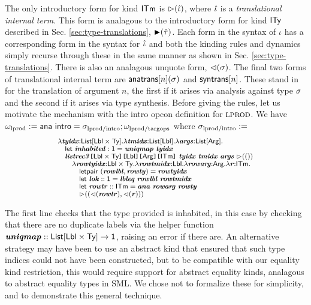 \documentclass[10pt,preprint]{sigplanconf}
\begin{document}
The only introductory form for kind ${\sf ITm}$ is ${\rhd}(\hat{\iota})$, where $\hat{\iota}$ is a \emph{translational internal term}. This form is analagous to the introductory form for kind ${\sf ITy}$ described in Sec. \ref{sec:type-translations}, ${\blacktriangleright}(\hat{\tau})$. Each form in the syntax of $\iota$ has a corresponding form in the syntax for $\hat{\iota}$ and both the kinding rules and dynamics simply recurse through these in the same manner as shown in Sec. \ref{sec:type-translations}. There is also an analagous unquote form, ${\lhd}(\sigma)$. %
The final two forms of translational internal term are ${\sf anatrans}[n](\sigma)$ and ${\sf syntrans}[n]$. These stand in for the translation of argument $n$, the first if it arises via analysis against type $\sigma$ and the second if it arises via type synthesis.  Before giving the rules, let us motivate the mechanism with the intro opcon definition for $\textsc{lprod}$. We have $\omega_\text{lprod} := {\sf ana}~{\sf intro}=\sigma_\text{lprod/intro}; \omega_\text{lprod/targops}$ where $\sigma_\text{lprod/intro} :=$
\[\small
\begin{array}{l}
\lambda\svar{tyidx}{:}\klist{\klbl\times\kty}.\lambda\svar{tmidx}{:}\klist{\klbl}.\lambda\svar{args}{:}\kargs.\\
\quad \keyw{let}~\svar{inhabited}:\kunit=\svar{uniqmap}~\svar{tyidx}\\
\quad \skap{\kitm}{\skap{\karg}{\skap{\klbl}{\skap{\klbl\times\kty}{\svar{listrec3}}}}}~\svar{tyidx}~\svar{tmidx}~\svar{args}~\sqitm{\itriv}\\
\quad\quad \lambda \svar{rowtyidx}{:}\klbl\times\kty.\lambda \svar{rowtmidx}{:}\klbl.\lambda\svar{rowarg}{:}\karg.\lambda \svar{r}{:}\kitm.\\
\quad\quad\quad \keyw{letpair}~(\svar{rowlbl}, \svar{rowty})=\svar{rowtyidx}\\
\quad\quad\quad \keyw{let}~\svar{lok}::\kunit=\svar{lbleq}~\svar{rowlbl} ~\svar{rowtmidx}\\
\quad\quad\quad \keyw{let}~\svar{rowtr} :: \kitm = \svar{ana}~\svar{rowarg}~\svar{rowty}\\
\quad\quad\quad \sqitm{(\quq{\svar{rowtr}}, \quq{\svar{r}})
}\end{array}
\]

The first line checks that the type provided is inhabited, in this case by checking that there are no duplicate labels via the helper function ${\textbf{\textit{uniqmap}}} :: {\sf List}[{\sf Lbl} \times {\sf Ty}]\rightarrow {\sf 1}$, raising an error if there are. An alternative strategy may have been to use an abstract kind that ensured that such type indices could not have been constructed, but to be compatible with our equality kind restriction, this would require support for abstract equality kinds, analagous to abstract equality types in SML. We chose not to formalize these for simplicity, and to demonstrate this general technique. %
\end{document}
